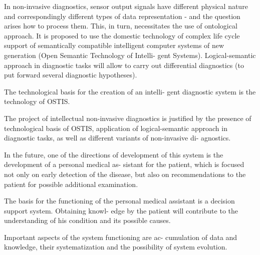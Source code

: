 \documentclass[10pt, a4paper]{article}
\begin{document}
\fontsize{10}{14}\selectfont
\begin{multicols}{2}
\setlength{\parindent}{0.8cm}
\par
\setlength{\parindent}{0.3cm}
\fontsize{10}{15}\selectfont
In non-invasive diagnostics, sensor output signals have
different physical nature and correspondingly different
types of data representation - and the question arises
how to process them. This, in turn, necessitates the
use of ontological approach. It is proposed to use the
domestic technology of complex life cycle support of
semantically compatible intelligent computer systems of
new generation (Open Semantic Technology of Intelli-
gent Systems). Logical-semantic approach in diagnostic
tasks will allow to carry out differential diagnostics (to
put forward several diagnostic hypotheses).
\par The technological basis for the creation of an intelli-
gent diagnostic system is the technology of OSTIS.
\par The project of intellectual non-invasive diagnostics is
justified by the presence of technological basis of OSTIS,
application of logical-semantic approach in diagnostic
tasks, as well as different variants of non-invasive di-
agnostics.
\par In the future, one of the directions of development of
this system is the development of a personal medical as-
sistant for the patient, which is focused not only on early
detection of the disease, but also on recommendations to
the patient for possible additional examination.
\par The basis for the functioning of the personal medical
assistant is a decision support system. Obtaining knowl-
edge by the patient will contribute to the understanding
of his condition and its possible causes.
\par Important aspects of the system functioning are ac-
cumulation of data and knowledge, their systematization
and the possibility of system evolution. \newline


\end{multicols}
\end{document}
